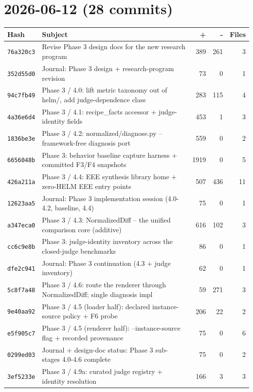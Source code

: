 \section*{2026-06-12 (28 commits)}
\begin{longtable}{@{}p{}p{}r r r@{}}
\toprule Hash & Subject & + & - & Files \\ \midrule\endhead
\texttt{76a320c3} & Revise Phase 3 design docs for the new research program & 389 & 261 & 3 \\
\texttt{352d55d0} & Journal: Phase 3 design + research-program revision & 73 & 0 & 1 \\
\texttt{94c7fb49} & Phase 3 / 4.0: lift metric taxonomy out of helm/, add judge-dependence class & 283 & 115 & 4 \\
\texttt{4a36e6d4} & Phase 3 / 4.1: recipe\_facts accessor + judge-identity fields & 453 & 1 & 3 \\
\texttt{1836be3e} & Phase 3 / 4.2: normalized/diagnose.py -- framework-free diagnosis port & 559 & 0 & 2 \\
\texttt{6656048b} & Phase 3: behavior baseline capture harness + committed F3/F4 snapshots & 1919 & 0 & 5 \\
\texttt{426a211a} & Phase 3 / 4.4: EEE synthesis library home + zero-HELM EEE entry points & 507 & 436 & 11 \\
\texttt{12623aa5} & Journal: Phase 3 implementation session (4.0-4.2, baseline, 4.4) & 75 & 0 & 1 \\
\texttt{a347eca0} & Phase 3 / 4.3: NormalizedDiff -- the unified comparison core (additive) & 616 & 102 & 3 \\
\texttt{cc6c9e8b} & Phase 3: judge-identity inventory across the closed-judge benchmarks & 86 & 0 & 1 \\
\texttt{dfe2c941} & Journal: Phase 3 continuation (4.3 + judge inventory) & 62 & 0 & 1 \\
\texttt{5c8f7a48} & Phase 3 / 4.6: route the renderer through NormalizedDiff; single diagnosis impl & 59 & 271 & 3 \\
\texttt{9e40aa92} & Phase 3 / 4.5 (loader half): declared instance-source policy + F6 probe & 206 & 22 & 2 \\
\texttt{e5f905c7} & Phase 3 / 4.5 (renderer half): --instance-source flag + recorded provenance & 75 & 0 & 6 \\
\texttt{0299ed03} & Journal + design-doc status: Phase 3 sub-stages 4.0-4.6 complete & 75 & 0 & 2 \\
\texttt{3ef5233e} & Phase 3 / 4.9a: curated judge registry + identity resolution & 166 & 3 & 3 \\

\end{longtable}
